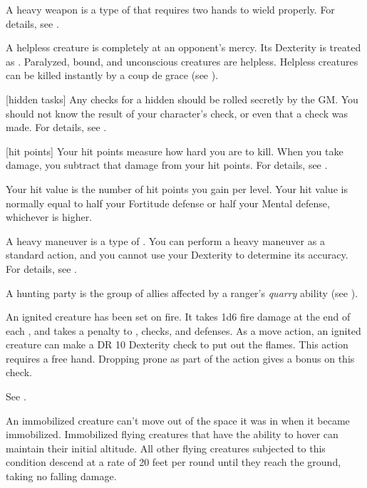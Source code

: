 A heavy weapon is a type of  that requires two hands to wield properly.
For details, see .

 A helpless creature is completely at an opponent's mercy.
Its Dexterity is treated as .
Paralyzed, bound, and unconscious creatures are helpless.
Helpless creatures can be killed instantly by a coup de grace (see ).

[hidden tasks] Any checks for a hidden  should be rolled secretly by the GM.\@
You should not know the result of your character's check, or even that a check was made.
For details, see .

[hit points] Your hit points measure how hard you are to kill.
When you take damage, you subtract that damage from your hit points.
For details, see .

 Your hit value is the number of hit points you gain per level.
Your hit value is normally equal to half your Fortitude defense or half your Mental defense, whichever is higher.

 A heavy maneuver is a type of .
You can perform a heavy maneuver as a standard action, and you cannot use your Dexterity to determine its accuracy.
For details, see .

 A hunting party is the group of allies affected by a ranger's \textit{quarry} ability (see ).

 An ignited creature has been set on fire.
It takes 1d6 fire damage at the end of each , and takes a  penalty to , checks, and defenses.
As a move action, an ignited creature can make a DR 10 Dexterity check to put out the flames.
This action requires a free hand.
Dropping prone as part of the action gives a  bonus on this check.

 See .

 An immobilized creature can't move out of the space it was in when it became immobilized. Immobilized flying creatures that have the ability to hover can maintain their initial altitude. All other flying creatures subjected to this condition descend at a rate of 20 feet per round until they reach the ground, taking no falling damage.

